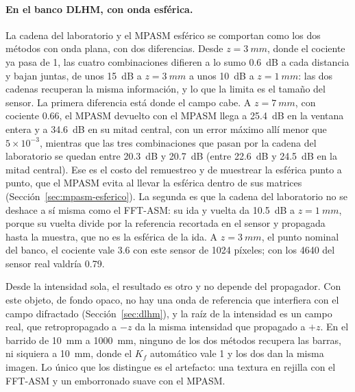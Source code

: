 \paragraph{En el banco DLHM, con onda esférica.} La cadena del laboratorio y el
MPASM esférico se comportan como los dos métodos con onda plana, con dos
diferencias. Desde $z = \SI{3}{mm}$, donde el cociente ya pasa de 1, las
cuatro combinaciones difieren a lo sumo \SI{0.6}{dB} a cada distancia y bajan
juntas, de unos \SI{15}{dB} a $z = \SI{3}{mm}$ a unos \SI{10}{dB} a
$z = \SI{1}{mm}$: las dos cadenas recuperan la misma información, y lo que la
limita es el tamaño del sensor. La primera diferencia está donde el campo
cabe. A $z = \SI{7}{mm}$, con cociente 0.66, el MPASM devuelto con el MPASM
llega a \SI{25.4}{dB} en la ventana entera y a \SI{34.6}{dB} en su mitad
central, con un error máximo allí menor que $5\times10^{-3}$, mientras que las
tres combinaciones que pasan por la cadena del laboratorio se quedan entre
\SI{20.3}{dB} y \SI{20.7}{dB} (entre \SI{22.6}{dB} y \SI{24.5}{dB} en la mitad
central). Ese es el costo del remuestreo y de muestrear la esférica punto a
punto, que el MPASM evita al llevar la esférica dentro de sus matrices
(Sección~\ref{sec:mpasm-esferico}). La segunda es que la cadena del
laboratorio no se deshace a sí misma como el FFT-ASM: su ida y vuelta da
\SI{10.5}{dB} a $z = \SI{1}{mm}$, porque su vuelta divide por la referencia
recortada en el sensor y propagada hasta la muestra, que no es la esférica de
la ida. A $z = \SI{3}{mm}$, el punto nominal del banco, el cociente vale 3.6
con este sensor de 1024 píxeles; con los 4640 del sensor real valdría 0.79.

Desde la intensidad sola, el resultado es otro y no depende del propagador.
Con este objeto, de fondo opaco, no hay una onda de referencia que interfiera
con el campo difractado (Sección~\ref{sec:dlhm}), y la raíz de la intensidad
es un campo real, que retropropagado a $-z$ da la misma intensidad que
propagado a $+z$. En el barrido de \SI{10}{mm} a \SI{1000}{mm}, ninguno de los
dos métodos recupera las barras, ni siquiera a \SI{10}{mm}, donde el $K_f$
automático vale 1 y los dos dan la misma imagen. Lo único que los distingue es
el artefacto: una textura en rejilla con el FFT-ASM y un emborronado suave con
el MPASM.

